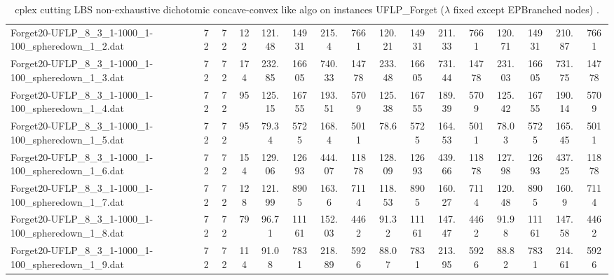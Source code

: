 \begin{sidewaystable}[!ht]
{\begin{tabular}{lccccccccccccccc}
Forget20-UFLP\_8\_3\_1-1000\_1-100\_spheredown\_1\_2.dat & 72 & 72 & 122 & 121.48 & 14931 & 215.4 & 7661 & 120.21 & 14931 & 211.33 & 7661 & 120.71 & 14931 & 210.87 & 7661 \\
Forget20-UFLP\_8\_3\_1-1000\_1-100\_spheredown\_1\_3.dat & 72 & 72 & 174 & 232.85 & 16605 & 740.33 & 14778 & 233.48 & 16605 & 731.44 & 14778 & 231.03 & 16605 & 731.75 & 14778 \\
Forget20-UFLP\_8\_3\_1-1000\_1-100\_spheredown\_1\_4.dat & 72 & 72 & 95 & 125.15 & 16755 & 193.51 & 5709 & 125.38 & 16755 & 189.39 & 5709 & 125.42 & 16755 & 190.14 & 5709 \\
Forget20-UFLP\_8\_3\_1-1000\_1-100\_spheredown\_1\_5.dat & 72 & 72 & 95 & 79.34 & 5725 & 168.4 & 5011 & 78.6 & 5725 & 164.53 & 5011 &  \textcolor{blue2}{78.03} & 5725 & 165.45 & 5011 \\
Forget20-UFLP\_8\_3\_1-1000\_1-100\_spheredown\_1\_6.dat & 72 & 72 & 154 & 129.06 & 12693 & 444.07 & 11878 & 128.09 & 12693 & 439.66 & 11878 & 127.98 & 12693 & 437.25 & 11878 \\
Forget20-UFLP\_8\_3\_1-1000\_1-100\_spheredown\_1\_7.dat & 72 & 72 & 128 & 121.99 & 8905 & 163.6 & 7114 & 118.53 & 8905 & 160.27 & 7114 & 120.48 & 8905 & 160.9 & 7114 \\
Forget20-UFLP\_8\_3\_1-1000\_1-100\_spheredown\_1\_8.dat & 72 & 72 & 79 & 96.71 & 11161 & 152.03 & 4462 &  \textcolor{blue2}{91.32} & 11161 & 147.47 & 4462 & 91.98 & 11161 & 147.58 & 4462 \\
Forget20-UFLP\_8\_3\_1-1000\_1-100\_spheredown\_1\_9.dat & 72 & 72 & 114 & 91.08 & 7831 & 218.89 & 5926 &  \textcolor{blue2}{88.07} & 7831 & 213.95 & 5926 & 88.82 & 7831 & 214.61 & 5926 \\
\bottomrule
\end{tabular}
}%
\caption{cplex cutting LBS non-exhaustive dichotomic concave-convex like algo on instances UFLP_Forget ($\lambda$ fixed except EPBranched nodes) .}
\end{sidewaystable}
